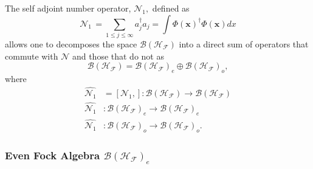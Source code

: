 \documentclass[aps,preprint]{revtex4}%
\begin{document}
The self adjoint number operator, $\mathcal{N}_{1},$ defined as
\begin{equation}
\mathcal{N}_{1}\mathcal{\,}=\sum_{1\leq j\leq\infty}a_{j}^{\dagger}a_{j}%
=\int\Phi\left(  \boldsymbol{x}\right)  ^{\dagger}\Phi\left(  \boldsymbol{x}%
\right)  dx
\end{equation}
allows one to decomposes the space $\mathcal{B}\left(  \mathcal{H}%
_{\mathcal{F}}\right)  $ into a direct sum of operators that commute with
$\mathcal{N}$ and those that do not as
\begin{equation}
\mathcal{B}\left(  \mathcal{H}_{\mathcal{F}}\right)  =\mathcal{B}\left(
\mathcal{H}_{\mathcal{F}}\right)  _{e}\oplus\mathcal{B}\left(  \mathcal{H}%
_{\mathcal{F}}\right)  _{o},
\end{equation}
where
\begin{align}
\widehat{\mathcal{N}_{1}}  &  =\left[  \mathcal{N}_{1},\right]  :\mathcal{B}%
\left(  \mathcal{H}_{\mathcal{F}}\right)  \rightarrow\mathcal{B}\left(
\mathcal{H}_{\mathcal{F}}\right) \nonumber\\
\widehat{\mathcal{N}_{1}}  &  :\mathcal{B}\left(  \mathcal{H}_{\mathcal{F}%
}\right)  _{e}\rightarrow\mathcal{B}\left(  \mathcal{H}_{\mathcal{F}}\right)
_{e}\nonumber\\
\widehat{\mathcal{N}_{1}}  &  :\mathcal{B}\left(  \mathcal{H}_{\mathcal{F}%
}\right)  _{o}\rightarrow\mathcal{B}\left(  \mathcal{H}_{\mathcal{F}}\right)
_{o}.
\end{align}


\subsubsection{Even Fock Algebra $\mathcal{B}\left(  \mathcal{H}_{\mathcal{F}%
}\right)  _{e}$}
\end{document}

